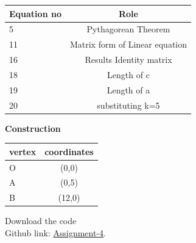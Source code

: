 \documentclass[10pt,a4paper]{report}
\begin{document}
\begin{multicols}{2}
\begin{center}
\setlength{\arrayrulewidth}{0.5mm}
\setlength{\tabcolsep}{5pt}
\renewcommand{\arraystretch}{3}
    \begin{tabular}{|l|c|}
    \hline 
    \textbf{Equation no} & \textbf{Role} \\ \hline
    5 &  Pythagorean Theorem \\ 
    11 & Matrix form of Linear equation  \\
    16 & Results Identity matrix  \\
    18 & Length of c\\
    19 & Length of a \\
    20 & substituting k=5\\
    \hline
      \end{tabular}
  \end{center} \vspace{2mm}
  
 \vspace{2mm} \textbf{Construction}
\begin{center}
\setlength{\arrayrulewidth}{0.5mm}
\setlength{\tabcolsep}{5pt}
\renewcommand{\arraystretch}{3}
    \begin{tabular}{|l|c|}
    \hline 
    \textbf{vertex} & \textbf{coordinates} \\ \hline
    O & (0,0)  \\ 
    A & (0,5)  \\
    B & (12,0) \\
    \hline
      \end{tabular}
  \end{center}
  
\raggedright  Download the code \\
Github link: \href{https://github.com/chiragshah1244/FWC/blob/main/assignments/assignment-1/code/src/seq.cpp}{Assignment-4}.
  \end{multicols}
\end{document}
